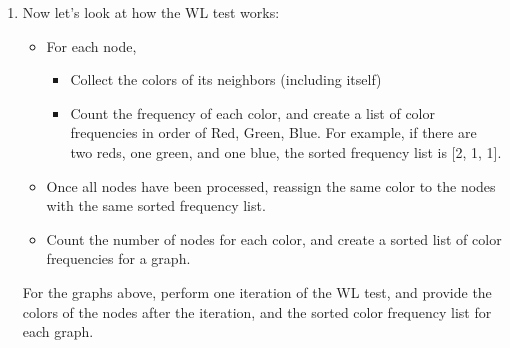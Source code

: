 \documentclass[a4paper, 12pt]{extarticle}
\begin{document}
\begin{enumerate}[resume]
\item Now let's look at how the WL test works:
\begin{itemize}
    \item For each node,
    \begin{itemize}
        \item Collect the colors of its neighbors (including itself)
        \item Count the frequency of each color, and create a list of color frequencies in order of Red, Green, Blue. For example, if there are two reds, one green, and one blue, the sorted frequency list is [2, 1, 1].
    \end{itemize}
    \item Once all nodes have been processed, reassign the same color to the nodes with the same sorted frequency list.
    \item Count the number of nodes for each color, and create a sorted list of color frequencies for a graph.
\end{itemize}

For the graphs above, perform one iteration of the WL test, and provide the colors of the nodes after the iteration, and the sorted color frequency list for each graph.


\begin{center}
\end{center}
\end{enumerate}
\end{document}
